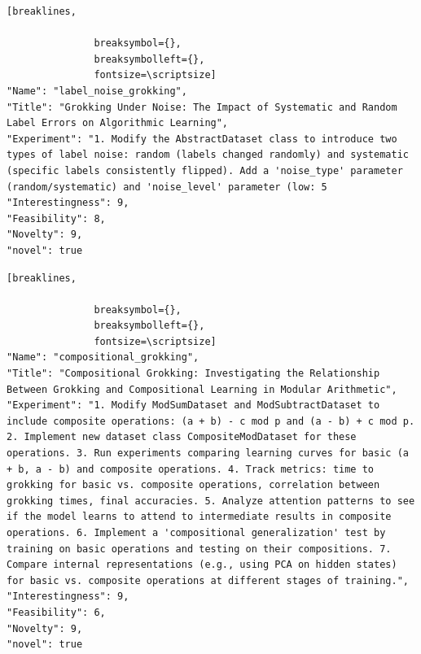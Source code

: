 \begin{tcolorbox}[
  breakable,
  colback  = blue!5!white,
  colframe = blue!75!black,
  title    = {Idea 13/50 - \texttt{label\_noise\_grokking}},
  fontupper=\scriptsize\ttfamily,
]
\begin{Verbatim}[breaklines,

               breaksymbol={},
               breaksymbolleft={},
               fontsize=\scriptsize]
"Name": "label_noise_grokking",
"Title": "Grokking Under Noise: The Impact of Systematic and Random Label Errors on Algorithmic Learning",
"Experiment": "1. Modify the AbstractDataset class to introduce two types of label noise: random (labels changed randomly) and systematic (specific labels consistently flipped). Add a 'noise_type' parameter (random/systematic) and 'noise_level' parameter (low: 5
"Interestingness": 9,
"Feasibility": 8,
"Novelty": 9,
"novel": true
\end{Verbatim}
\end{tcolorbox}

\begin{tcolorbox}[
  breakable,
  colback  = blue!5!white,
  colframe = blue!75!black,
  title    = {Idea 14/50 - \texttt{compositional\_grokking}},
  fontupper=\scriptsize\ttfamily,
]
\begin{Verbatim}[breaklines,

               breaksymbol={},
               breaksymbolleft={},
               fontsize=\scriptsize]
"Name": "compositional_grokking",
"Title": "Compositional Grokking: Investigating the Relationship Between Grokking and Compositional Learning in Modular Arithmetic",
"Experiment": "1. Modify ModSumDataset and ModSubtractDataset to include composite operations: (a + b) - c mod p and (a - b) + c mod p. 2. Implement new dataset class CompositeModDataset for these operations. 3. Run experiments comparing learning curves for basic (a + b, a - b) and composite operations. 4. Track metrics: time to grokking for basic vs. composite operations, correlation between grokking times, final accuracies. 5. Analyze attention patterns to see if the model learns to attend to intermediate results in composite operations. 6. Implement a 'compositional generalization' test by training on basic operations and testing on their compositions. 7. Compare internal representations (e.g., using PCA on hidden states) for basic vs. composite operations at different stages of training.",
"Interestingness": 9,
"Feasibility": 6,
"Novelty": 9,
"novel": true
\end{Verbatim}
\end{tcolorbox}

